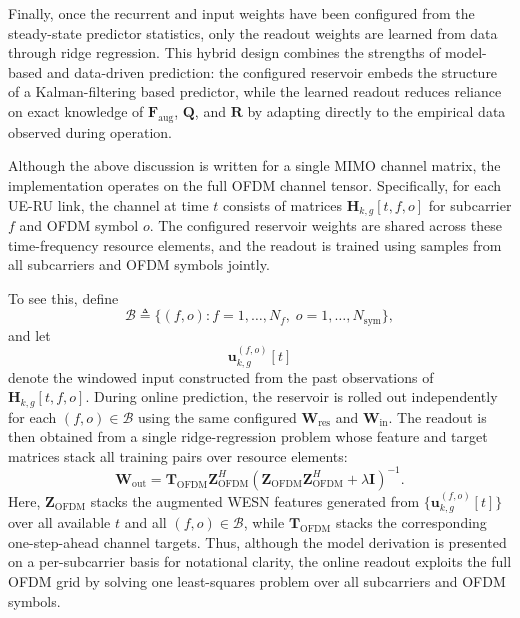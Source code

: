 \documentclass[lettersize,journal]{IEEEtran}
\begin{document}
Finally, once the recurrent and input weights have been configured from the steady-state predictor statistics, only the readout weights are learned from data through ridge regression. This hybrid design combines the strengths of model-based and data-driven prediction: the configured reservoir embeds the structure of a Kalman-filtering based predictor, while the learned readout reduces reliance on exact knowledge of $\mathbf{F}_{\mathrm{aug}}$, $\mathbf{Q}$, and $\mathbf{R}$ by adapting directly to the empirical data observed during operation.

Although the above discussion is written for a single MIMO channel matrix, the implementation operates on the full OFDM channel tensor. Specifically, for each UE-RU link, the channel at time $t$ consists of matrices
$\mathbf{H}_{k,g}[t,f,o]$ for subcarrier $f$ and OFDM symbol $o$. The configured reservoir weights are shared across these time-frequency resource elements, and the readout is trained using samples from all subcarriers and OFDM symbols jointly.

To see this, define
\begin{equation}
\mathcal{B} \triangleq \{(f,o): f=1,\dots,N_f,\; o=1,\dots,N_{\mathrm{sym}}\},
\end{equation}
and let
\begin{equation}
\mathbf{u}_{k,g}^{(f,o)}[t]
\end{equation}
denote the windowed input constructed from the past observations of
$\mathbf{H}_{k,g}[t,f,o]$. During online prediction, the reservoir is rolled out independently for each $(f,o)\in\mathcal{B}$ using the same configured
$\mathbf{W}_{\mathrm{res}}$ and $\mathbf{W}_{\mathrm{in}}$. The readout is then obtained from a single ridge-regression problem whose feature and target matrices stack all training pairs over resource elements:
\begin{equation}
\mathbf{W}_{\mathrm{out}}
=
\mathbf{T}_{\mathrm{OFDM}}\mathbf{Z}_{\mathrm{OFDM}}^H
\left(
\mathbf{Z}_{\mathrm{OFDM}}\mathbf{Z}_{\mathrm{OFDM}}^H
+
\lambda\mathbf{I}
\right)^{-1}.
\end{equation}
Here, $\mathbf{Z}_{\mathrm{OFDM}}$ stacks the augmented WESN features generated from
$\{\mathbf{u}_{k,g}^{(f,o)}[t]\}$ over all available $t$ and all $(f,o)\in\mathcal{B}$, while
$\mathbf{T}_{\mathrm{OFDM}}$ stacks the corresponding one-step-ahead channel targets. Thus, although the model derivation is presented on a per-subcarrier basis for notational clarity, the online readout exploits the full OFDM grid by solving one least-squares problem over all subcarriers and OFDM symbols.
\end{document}
